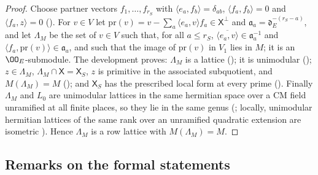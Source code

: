 \begin{proof}
Choose partner vectors $f_1,\dots,f_{r_S}$ with $\langle e_a,f_b\rangle=\delta_{ab}$, $\langle f_a,f_b\rangle=0$ and
$\langle f_a,z\rangle=0$ (). For $v\in V$
let $\mathrm{pr}(v)=v-\sum_a\langle e_a,v\rangle f_a\in\mathsf X^\perp$ and $\mathfrak a_a=\mathfrak d_E^{-(r_S-a)}$, and let
$\Lambda_M$ be the set of $v\in V$ such that, for all $a\le r_S$, $\overline{\langle e_a,v\rangle}\in\mathfrak a_a^{-1}$ and
$\langle f_a,\mathrm{pr}(v)\rangle\in\mathfrak a_a$, and such that the image of $\mathrm{pr}(v)$ in $V_1$ lies in $M$; it is
an $\OO_E$-submodule. The development proves: $\Lambda_M$ is a lattice
(); it is unimodular
(); $z\in\Lambda_M$, $\Lambda_M\cap\mathsf X=\mathsf X_S$,
$z$ is primitive in the associated subquotient, and $M(\Lambda_M)=M$
(); and $\mathsf X_S$ has the prescribed local
form at every prime (). Finally $\Lambda_M$ and
$L_0$ are unimodular lattices in the same hermitian space over a CM field unramified at all finite places, so they lie in the
same genus (; locally, unimodular hermitian lattices
of the same rank over an unramified quadratic extension are isometric \cite{Jacobowitz1962}). Hence $\Lambda_M$ is a row
lattice with $M(\Lambda_M)=M$.
\end{proof}

\subsection{Remarks on the formal statements}\label{pf:multnc:sec-remarks}

